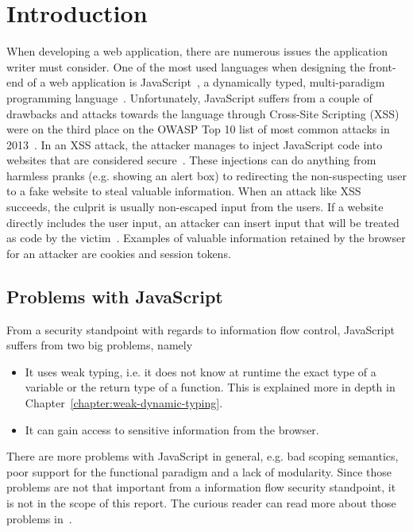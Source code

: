\chapter{Introduction}
\label{chapter:intro}
When developing a web application, there are numerous issues the application writer must consider. One of the most used languages when designing the front-end of a web application is JavaScript~\cite{javascript_popularity}, a dynamically typed, multi-paradigm programming language~\cite{javascript_info}. Unfortunately, JavaScript suffers from a couple of drawbacks and attacks towards the language through Cross-Site Scripting (XSS) were on the third place on the OWASP Top 10 list of most common attacks in 2013~\cite{owasp_xss_rank}. In an XSS attack, the attacker manages to inject JavaScript code into websites that are considered secure~\cite{owasp_xss, excess_xss}. These injections can do anything from harmless pranks (e.g. showing an alert box) to redirecting the non-suspecting user to a fake website to steal valuable information. When an attack like XSS succeeds, the culprit is usually non-escaped input from the users. If a website directly includes the user input, an attacker can insert input that will be treated as code by the victim~\cite{excess_xss}. Examples of valuable information retained by the browser for an attacker are cookies and session tokens.
\section{Problems with JavaScript}
From a security standpoint with regards to information flow control, JavaScript suffers from two big problems, namely
\begin{itemize}
  \item It uses weak typing, i.e. it does not know at runtime the exact type of a variable or the return type of a function. This is explained more in depth in Chapter~\ref{chapter:weak-dynamic-typing}.
  \item It can gain access to sensitive information from the browser.
\end{itemize}
There are more problems with JavaScript in general, e.g. bad scoping semantics, poor support for the functional paradigm and a lack of modularity. Since those problems are not that important from a information flow security standpoint, it is not in the scope of this report. The curious reader can read more about those problems in~\cite{haste-lang}.

